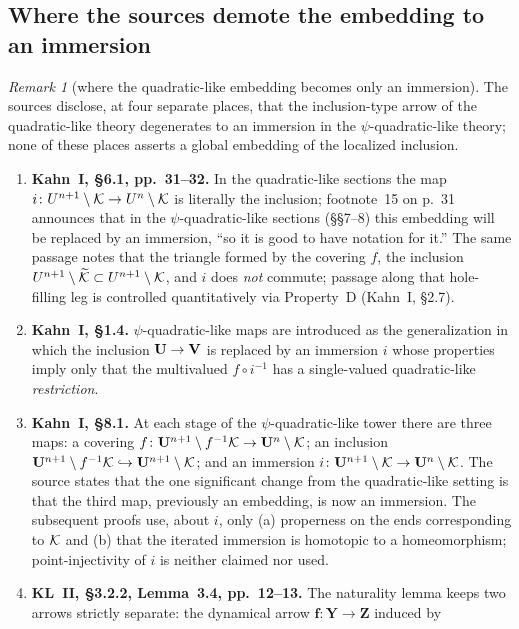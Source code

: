 \documentclass[11pt,reqno]{amsart}
\theoremstyle{definition}
\theoremstyle{remark}
\newtheorem{remark}[theorem]{Remark}
\begin{document}
\subsection*{Where the sources demote the embedding to an immersion}
\begin{remark}[where the quadratic-like embedding becomes only an immersion]\label{rem:kahn-immersion-disclosures}
The sources disclose, at four separate places, that the
inclusion-type arrow of the quadratic-like theory degenerates to an
immersion in the \(\psi\)-quadratic-like theory; none of these places
asserts a global embedding of the localized inclusion.
\begin{enumerate}
\item \textbf{Kahn~I, \S6.1, pp.~31--32.}  In the
quadratic-like sections the map
\(i\colon U^{n+1}\setminus\mathcal{K}\to U^n\setminus\mathcal{K}\) is literally the inclusion;
footnote~15 on p.~31 announces that in the \(\psi\)-quadratic-like
sections (\S\S7--8) this embedding will be
replaced by an immersion, ``so it is good to have notation for it.''
The same passage notes that the triangle
formed by the covering \(f\), the inclusion
\(U^{n+1}\setminus\widetilde{\mathcal{K}}\subset U^{n+1}\setminus\mathcal{K}\), and \(i\) does
\emph{not} commute; passage along that hole-filling leg is controlled
quantitatively via Property~D (Kahn~I, \S2.7).
\item \textbf{Kahn~I, \S1.4.}
\(\psi\)-quadratic-like maps are introduced as the generalization in
which the inclusion \(\mathbf{U}\to\mathbf{V}\) is replaced by an immersion \(i\)
whose properties imply only that the multivalued \(f\circ i^{-1}\) has
a single-valued quadratic-like \emph{restriction}.
\item \textbf{Kahn~I, \S8.1.}  At each stage of
the \(\psi\)-quadratic-like tower there are three maps: a covering
\(f\colon\mathbf{U}^{n+1}\setminus f^{-1}\mathcal{K}\to\mathbf{U}^n\setminus\mathcal{K}\); an inclusion
\(\mathbf{U}^{n+1}\setminus f^{-1}\mathcal{K}\hookrightarrow\mathbf{U}^{n+1}\setminus\mathcal{K}\); and an
immersion \(i\colon\mathbf{U}^{n+1}\setminus\mathcal{K}\to\mathbf{U}^n\setminus\mathcal{K}\).  The source
states that the one significant change from the quadratic-like setting
is that the third map, previously an embedding, is now an immersion.
The subsequent proofs use, about \(i\), only (a)
properness on the ends corresponding to \(\mathcal{K}\) and (b)
that the iterated immersion is homotopic to a homeomorphism;
point-injectivity of \(i\) is neither claimed nor used.
\item \textbf{KL~II, \S3.2.2, Lemma~3.4, pp.~12--13.}  The naturality lemma
keeps two arrows strictly separate: the dynamical arrow
\(\mathbf f\colon\mathbf Y\to\mathbf Z\) induced by

\end{enumerate}
\end{remark}
\end{document}
